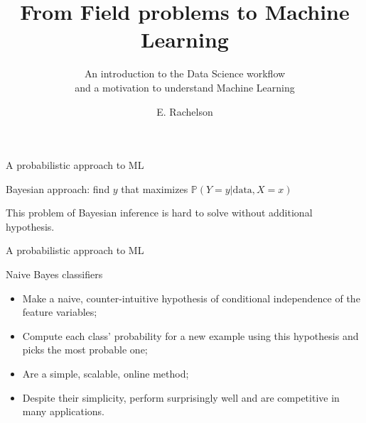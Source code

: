 \documentclass{beamer}
\title[A few topics in Reinforcement Learning]{From Field problems to Machine Learning}
\subtitle{An introduction to the Data Science workflow\\and a motivation to understand Machine Learning}
\author{E. Rachelson}
\institute{\texttt{[image: img/isae.jpg]}}
\date{}
\begin{document}
\begin{frame}{A probabilistic approach to ML}
\begin{block}{}
Bayesian approach: find $y$ that maximizes $\mathbb{P}(Y=y|\textrm{data}, X=x)$
\end{block}
This problem of Bayesian inference is hard to solve without additional hypothesis.
\end{frame}

\begin{frame}{A probabilistic approach to ML}
\begin{block}{Naive Bayes classifiers}
\begin{itemize}
\item Make a naive, counter-intuitive hypothesis of conditional independence of the feature variables;
\item Compute each class' probability for a new example using this hypothesis and picks the most probable one;
\item Are a simple, scalable, online method;
\item Despite their simplicity, perform surprisingly well and are competitive in many applications.
\end{itemize}
\end{block}

\end{frame}
\end{document}
